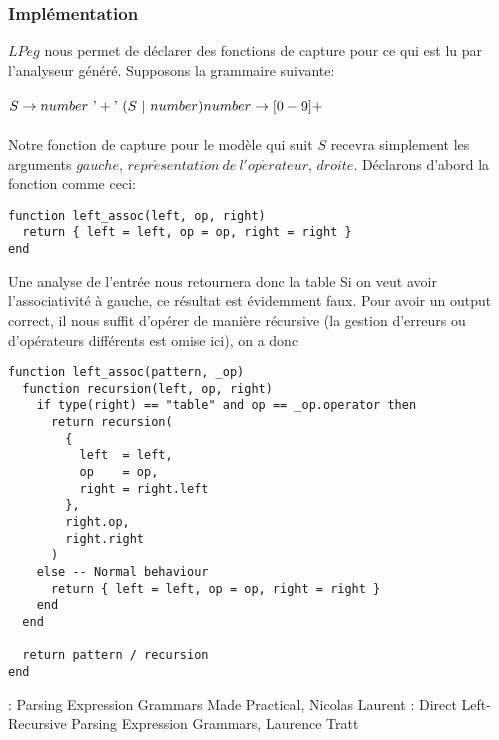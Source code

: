 \documentclass{article}
\begin{document}
\subsubsection{Implémentation}
$LPeg$ nous permet de déclarer des fonctions de capture pour ce qui est lu par l'analyseur généré. Supposons la grammaire suivante: \\ \\
\begin{math}
S \rightarrow number \ \textrm{'}+\textrm{'} \ (S \ | \ number) \\
number \rightarrow [0-9]+
\end{math} \\ \\
Notre fonction de capture pour le modèle qui suit $S$ recevra simplement les arguments $gauche$, $repr\acute{e}sentation \ de \ l'op\acute{e}rateur$, $droite$. Déclarons d'abord la fonction comme ceci:
\begin{verbatim}
function left_assoc(left, op, right)
  return { left = left, op = op, right = right }
end
\end{verbatim}
Une analyse de l'entrée  \noindent nous retournera donc la table 
\noindent Si on veut avoir l'associativité à gauche, ce résultat est évidemment faux. Pour avoir un output correct, il nous suffit d'opérer de manière récursive (la gestion d'erreurs ou d'opérateurs différents est omise ici), on a donc
\begin{verbatim}
function left_assoc(pattern, _op)
  function recursion(left, op, right)
    if type(right) == "table" and op == _op.operator then
      return recursion(
        {
          left  = left,
          op    = op,
          right = right.left
        },
        right.op,
        right.right
      )
    else -- Normal behaviour
      return { left = left, op = op, right = right }
    end
  end
  
  return pattern / recursion
end
\end{verbatim}
\newpage
\noindent[1]: Parsing Expression Grammars Made Practical, Nicolas Laurent \newline
[2]: Direct Left-Recursive Parsing Expression Grammars, Laurence Tratt
\end{document}
